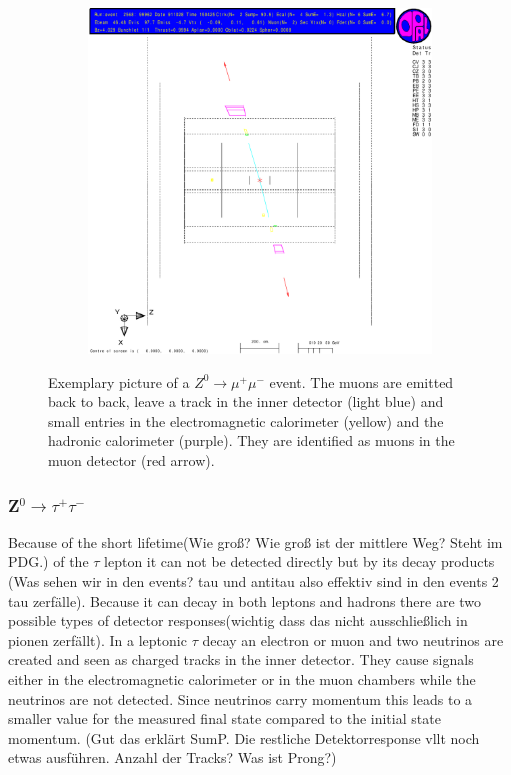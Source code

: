 \documentclass[11pt, a4paper]{article}
\numberwithin{equation}{section}
\newcommand{\korr}[1]{{\color{red}(#1)}}
\begin{document}
\begin{figure}[h]
	\ContinuedFloat
	\begin{subfigure}{\textwidth}
		\centering
		\includegraphics[width=.9\textwidth]{./data/tag1/mm_pics/cropped/mm_02_side}
	\end{subfigure}
	\caption{Exemplary picture of a $Z^0\rightarrow \mu^+\mu^-$ event. The muons are emitted back to back, leave a track in the inner detector (light blue) and small entries in the electromagnetic calorimeter (yellow) and the hadronic calorimeter (purple). They are identified as muons in the muon detector (red arrow).}
\end{figure}
\clearpage
\subsubsection{Z$^0\rightarrow \tau^+\tau^-$}

Because of the short lifetime\korr{Wie groß? Wie groß ist der mittlere Weg? Steht im PDG.} of the $\tau$ lepton it can not be detected directly but by its decay products \korr{Was sehen wir in den events? tau und antitau also effektiv sind in den events 2 tau zerfälle}.
Because it can decay in both leptons and hadrons there are two possible types of detector responses\korr{wichtig dass das nicht ausschließlich in pionen zerfällt}.
In a leptonic $\tau$ decay an electron or muon and two neutrinos are created and seen as charged tracks in the inner detector.
They cause signals either in the electromagnetic calorimeter or in the muon chambers while the neutrinos are not detected.
Since neutrinos carry momentum this leads to a smaller value for the measured final state compared to the initial state momentum.
\korr{Gut das erklärt SumP. Die restliche Detektorresponse vllt noch etwas ausführen. Anzahl der Tracks? Was ist Prong?}
\end{document}
